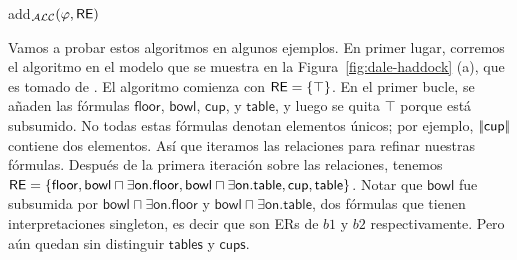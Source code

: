 \begin{algorithm}[H]
\caption{add$_\mathcal{ALC}(\varphi,\textsf{RE})$}
\label{algo:bisim-add-alc}
\end{algorithm}

Vamos a probar estos algoritmos en algunos ejemplos. En primer lugar, corremos el \el algoritmo en el modelo que se muestra en la Figura~\ref{fig:dale-haddock} (a), que es
tomado de \cite{dale91:gener}. El
algoritmo comienza con $ \textsf{RE} = \{\top \} $. En el primer bucle, se a\~naden
las f\'ormulas $\mathsf{floor}$, $\mathsf{bowl}$, $\mathsf{cup}$, y
$\mathsf{table}$, y luego se quita $\top$ porque est\'a subsumido.
No todas estas f\'ormulas denotan elementos \'unicos; por ejemplo,
$|\!|\mathsf{cup}|\!|$ contiene dos elementos. As\'i que iteramos
las relaciones para refinar nuestras f\'ormulas. Despu\'es de la primera iteraci\'on sobre
las relaciones, tenemos  $\textsf{RE} = \{ \mathsf{floor}, \mathsf{bowl} \sqcap
\exists \mathsf{on}.\mathsf{floor}, \mathsf{bowl} \sqcap \exists
\mathsf{on}.\mathsf{table}, \mathsf{cup}, \mathsf{table} \}$. Notar que
$\mathsf{bowl}$ fue subsumida por $\mathsf{bowl} \sqcap
\exists \mathsf{on}.\mathsf{floor}$ y $\mathsf{bowl} \sqcap \exists
\mathsf{on}.\mathsf{table}$, dos f\'ormulas que tienen interpretaciones singleton, es decir que son ERs de $b1$ y $b2$ respectivamente. Pero a\'un quedan sin distinguir $\mathsf{tables}$ y $\mathsf{cups}$.

